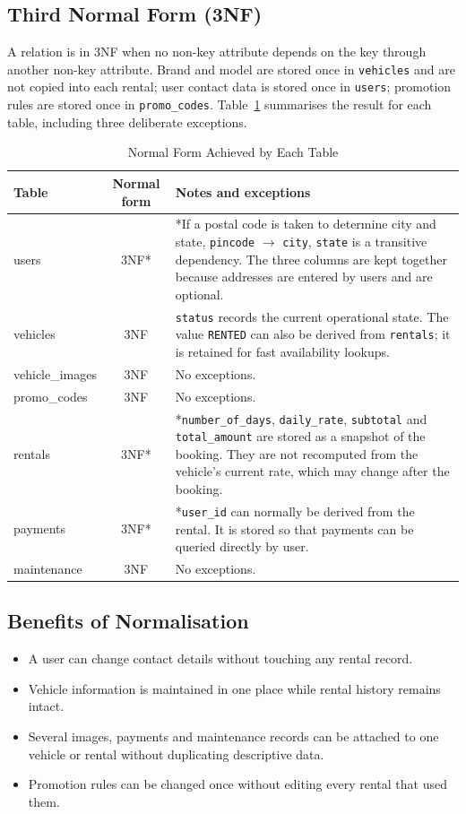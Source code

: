 \documentclass[10pt,a4paper]{report}
\newcommand{\col}[1]{\texttt{#1}}
\begin{document}
\subsection{Third Normal Form (3NF)}
A relation is in 3NF when no non-key attribute depends on the key through another non-key attribute. Brand and model are stored once in \col{vehicles} and are not copied into each rental; user contact data is stored once in \col{users}; promotion rules are stored once in \col{promo_codes}. Table~\ref{tab:nf} summarises the result for each table, including three deliberate exceptions.

\begin{table}[htbp]
\centering
\small
\caption{Normal Form Achieved by Each Table}
\label{tab:nf}
\begin{tabular}{@{}lc>{\raggedright\arraybackslash}p{8.4cm}@{}}
\toprule
\textbf{Table} & \textbf{Normal form} & \textbf{Notes and exceptions} \\
\midrule
users & 3NF* & *If a postal code is taken to determine city and state, \col{pincode} $\rightarrow$ \col{city}, \col{state} is a transitive dependency. The three columns are kept together because addresses are entered by users and are optional. \\
vehicles & 3NF & \col{status} records the current operational state. The value \col{RENTED} can also be derived from \col{rentals}; it is retained for fast availability lookups. \\
vehicle\_images & 3NF & No exceptions. \\
promo\_codes & 3NF & No exceptions. \\
rentals & 3NF* & *\col{number_of_days}, \col{daily_rate}, \col{subtotal} and \col{total_amount} are stored as a snapshot of the booking. They are not recomputed from the vehicle's current rate, which may change after the booking. \\
payments & 3NF* & *\col{user_id} can normally be derived from the rental. It is stored so that payments can be queried directly by user. \\
maintenance & 3NF & No exceptions. \\
\bottomrule
\end{tabular}
\end{table}

\subsection{Benefits of Normalisation}
\begin{itemize}
  \item A user can change contact details without touching any rental record.
  \item Vehicle information is maintained in one place while rental history remains intact.
  \item Several images, payments and maintenance records can be attached to one vehicle or rental without duplicating descriptive data.
  \item Promotion rules can be changed once without editing every rental that used them.
\end{itemize}
\end{document}
